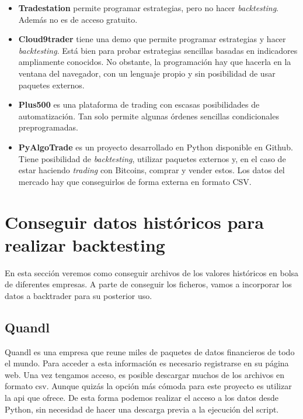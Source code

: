 \documentclass[12pt,a4paper]{article}
\begin{document}
		\begin{itemize}
			\item \textbf{Tradestation} permite programar estrategias, pero no hacer \textit{backtesting}. Adem\'as no es de acceso gratuito.
			
			\item \textbf{Cloud9trader} tiene una demo que permite programar estrategias y hacer \textit{backtesting}. Est\'a bien para probar estrategias sencillas basadas en indicadores ampliamente conocidos. No obstante, la programaci\'on hay que hacerla en la ventana del navegador, con un lenguaje propio y sin posibilidad de usar paquetes externos.
			
			\item \textbf{Plus500} es una plataforma de trading con escasas posibilidades de automatizaci\'on. Tan solo permite algunas \'ordenes sencillas condicionales preprogramadas.
			
			\item \textbf{PyAlgoTrade} es un proyecto desarrollado en Python disponible en Github. Tiene posibilidad de \textit{backtesting}, utilizar paquetes externos y, en el caso de estar haciendo \textit{trading} con Bitcoins, comprar y vender estos. Los datos del mercado hay que conseguirlos de forma externa en formato CSV.
		\end{itemize}
		
		\newpage
		
	\newpage	
	\section{Conseguir datos hist\'oricos para realizar backtesting}\label{sec:get_data}
		
		En esta secci\'on veremos como conseguir archivos de los valores hist\'oricos en bolsa de diferentes empresas. A parte de conseguir los ficheros, vamos a incorporar los datos a backtrader para su posterior uso.
		
		\subsection{Quandl}
		
		Quandl es una empresa que reune miles de paquetes de datos financieros de todo el mundo. Para acceder a esta informaci\'on es necesario registrarse en su p\'agina web. Una vez tengamos acceso, es posible descargar muchos de los archivos en formato csv. Aunque quiz\'as la opci\'on m\'as c\'omoda para este proyecto es utilizar la api que ofrece. De esta forma podemos realizar el acceso a los datos desde Python, sin necesidad de hacer una descarga previa a la ejecuci\'on del script.\\
		
\end{document}
